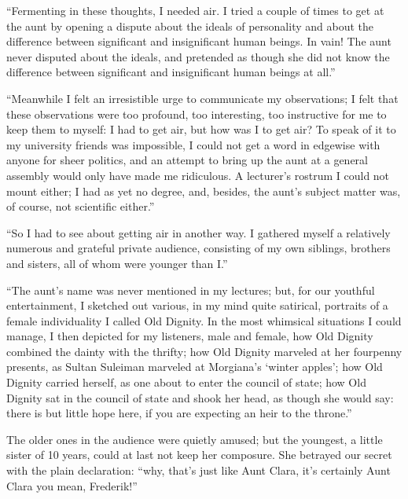 \documentclass[12pt,a4paper]{book}
\begin{document}
``Fermenting in these thoughts, I needed air. I tried a couple of times to get at the aunt by opening a dispute about the ideals of personality and about the difference between significant and insignificant human beings. In vain! The aunt never disputed about the ideals, and pretended as though she did not know the difference between significant and insignificant human beings at all.''

``Meanwhile I felt an irresistible urge to communicate my observations; I felt that these observations were too profound, too interesting, too instructive for me to keep them to myself: I had to get air, but how was I to get air? To speak of it to my university friends was impossible, I could not get a word in edgewise with anyone for sheer politics, and an attempt to bring up the aunt at a general assembly would only have made me ridiculous. A lecturer's rostrum I could not mount either; I had as yet no degree, and, besides, the aunt's subject matter was, of course, not scientific either.''

``So I had to see about getting air in another way. I gathered myself a relatively numerous and grateful private audience, consisting of my own siblings, brothers and sisters, all of whom were younger than I.''

``The aunt's name was never mentioned in my lectures; but, for our youthful entertainment, I sketched out various, in my mind quite satirical, portraits of a female individuality I called Old Dignity. In the most whimsical situations I could manage, I then depicted for my listeners, male and female, how Old Dignity combined the dainty with the thrifty; how Old Dignity marveled at her fourpenny presents, as Sultan Suleiman marveled at Morgiana's `winter apples'; how Old Dignity carried herself, as one about to enter the council of state; how Old Dignity sat
in the council of state and shook her head, as though she would say: there is but little hope here, if you are expecting an heir to the throne.''

The older ones in the audience were quietly amused; but the youngest, a little sister of 10 years, could at last not keep her composure. She betrayed our secret with the plain declaration: ``why, that's just like Aunt Clara, it's certainly Aunt Clara you mean, Frederik!''
\end{document}
